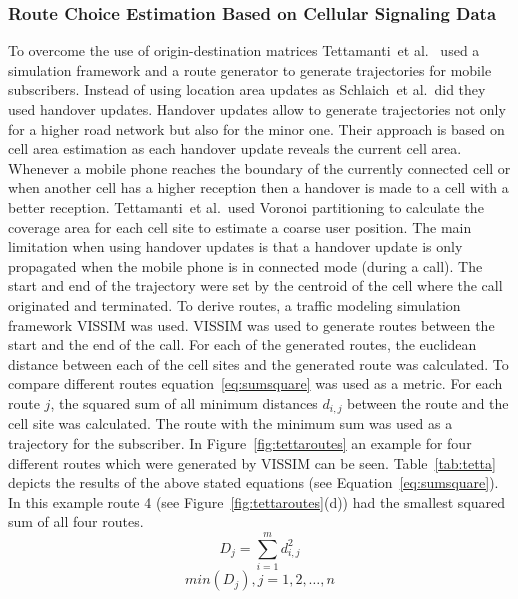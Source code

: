 \documentclass[master,english]{hgbthesis}
\begin{document}
\subsubsection{Route Choice Estimation Based on Cellular Signaling Data}
To overcome the use of origin-destination matrices Tettamanti~et al.\ \cite{Tettamanti2012} used a simulation framework and a route generator to generate trajectories for mobile subscribers. Instead of using location area updates as Schlaich~et al.\ did they used handover updates. Handover updates allow to generate trajectories not only for a higher road network but also for the minor one. Their approach is based on cell area estimation as each handover update reveals the current cell area. Whenever a mobile phone reaches the boundary of the currently connected cell or when another cell has a higher reception then a handover is made to a cell with a better reception. Tettamanti~et al.\ used Voronoi partitioning to calculate the coverage area for each cell site to estimate a coarse user position.
The main limitation when using handover updates is that a handover update is only propagated when the mobile phone is in connected mode (during a call).
The start and end of the trajectory were set by the centroid of the cell where the call originated and terminated. To derive routes, a traffic modeling simulation framework VISSIM was used. VISSIM was used to generate routes between the start and the end of the call. For each of the generated routes, the euclidean distance between each of the cell sites and the generated route was calculated. To compare different routes equation~\ref{eq:sumsquare} was used  as a metric. For each route $j$, the squared sum of all minimum distances $d_{i,j}$ between the route and the cell site was calculated. The route with the minimum sum was used as a trajectory for the subscriber.
In Figure~\ref{fig:tettaroutes} an example for four different routes which were generated by VISSIM can be seen. Table~\ref{tab:tetta} depicts the results of the above stated equations (see Equation~\ref{eq:sumsquare}). In this example route 4 (see Figure~\ref{fig:tettaroutes}(d)) had the smallest squared sum of all four routes.
\begin{equation}
\label{eq:sumsquare}
D_j=\sum_{i=1}^{m} d_{i,j}^{2}
\end{equation}
\begin{equation}
\label{eq:minsum}
min(D_j), j = 1,2,\ldots,n
\end{equation}
\end{document}
